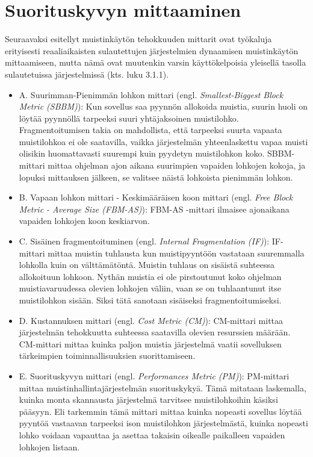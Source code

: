 \section{Suorituskyvyn mittaaminen}

Seuraavaksi esitellyt muistinkäytön tehokkuuden mittarit ovat työkaluja erityisesti reaaliaikaisten sulautettujen järjestelmien dynaamisen muistinkäytön mittaamiseen, mutta nämä ovat muutenkin varsin käyttökelpoisia yleisellä tasolla sulautetuissa järjestelmissä (kts. luku 3.1.1).

\begin{itemize}
\item{A. Suurimman-Pienimmän lohkon mittari (engl. \textit{Smallest-Biggest Block Metric (SBBM)}): Kun sovellus saa pyynnön allokoida muistia, suurin huoli on löytää pyynnöllä tarpeeksi suuri yhtäjaksoinen muistilohko. Fragmentoitumisen takia on mahdollista, että tarpeeksi suurta vapaata muistilohkoa ei ole saatavilla, vaikka järjestelmän yhteenlaskettu vapaa muisti olisikin huomattavasti suurempi kuin pyydetyn muistilohkon koko. SBBM-mittari mittaa ohjelman ajon aikana suurimpien vapaiden lohkojen kokoja, ja lopuksi mittauksen jälkeen, se valitsee näistä lohkoista pienimmän lohkon.}\cite{tmtt@2006}

\item{B. Vapaan lohkon mittari - Keskimääräisen koon mittari (engl. \textit{Free Block Metric - Average Size (FBM-AS)}): FBM-AS -mittari ilmaisee ajonaikana vapaiden lohkojen koon keskiarvon.}\cite{tmtt@2006}

\item{C. Sisäinen fragmentoituminen (engl. \textit{Internal Fragmentation (IF)}): IF-mittari mittaa muistin tuhlausta kun muistipyyntöön vastataan suuremmalla lohkolla kuin on välttämätöntä. Muistin tuhlaus on sisäistä suhteessa allokoituun lohkoon. Nythän muistia ei ole pirstoutunut koko ohjelman muistiavaruudessa olevien lohkojen väliin, vaan se on tuhlaantunut itse muistilohkon sisään. Siksi tätä sanotaan sisäiseksi fragmentoitumiseksi.}\cite{tmtt@2006}

\item{D. Kustannuksen mittari (engl. \textit{Cost Metric (CM)}): CM-mittari mittaa järjestelmän tehokkuutta suhteessa saatavilla olevien resurssien määrään. CM-mittari mittaa kuinka paljon muistia järjestelmä vaatii sovelluksen tärkeimpien toiminnallisuuksien suorittamiseen.}\cite{tmtt@2006}

\item{E. Suorituskyvyn mittari (engl. \textit{Performances Metric (PM)}): PM-mittari mittaa muistinhallintajärjestelmän suorituskykyä. Tämä mitataan laskemalla, kuinka monta skannausta järjestelmä tarvitsee muistilohkoihin käsiksi pääsyyn. Eli tarkemmin tämä mittari mittaa kuinka nopeasti sovellus löytää pyyntöä vastaavan tarpeeksi ison muistilohkon järjestelmästä, kuinka nopeasti lohko voidaan vapauttaa ja asettaa takaisin oikealle paikalleen vapaiden lohkojen listaan.}\cite{tmtt@2006}

\end{itemize}

